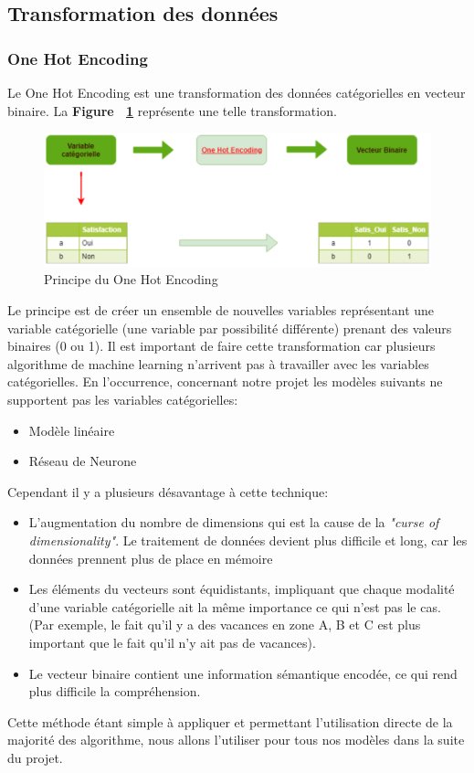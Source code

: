 \documentclass{article} %
\begin{document}
\subsection{Transformation des données}
\subsubsection{One Hot Encoding}
Le One Hot Encoding est une transformation des données catégorielles en vecteur binaire. La \textbf{Figure ~\ref{fig:OHE}} représente une telle transformation.
\begin{figure}[!h]
	\centering
	\includegraphics[keepaspectratio = true,scale=0.55]{OHE.png}
	\caption{Principe du One Hot Encoding}
	\label{fig:OHE}
\end{figure}
Le principe est de créer un ensemble de nouvelles variables représentant une variable catégorielle (une variable par possibilité différente) prenant des valeurs binaires (0 ou 1). Il est important de faire cette transformation car plusieurs algorithme de machine learning n'arrivent pas à travailler avec les variables catégorielles. En l'occurrence, concernant notre projet les modèles suivants ne supportent pas les variables catégorielles: \begin{itemize}
	\item Modèle linéaire
	\item Réseau de Neurone
\end{itemize}
Cependant il y a plusieurs désavantage à cette technique:
\begin{itemize}
	\item L'augmentation du nombre de dimensions qui est la cause de la \textit{"curse of dimensionality"}. Le traitement de données devient plus difficile et long, car les données prennent plus de place en mémoire
	\item Les éléments du vecteurs sont équidistants, impliquant que chaque modalité d'une variable catégorielle ait la même importance ce qui n'est pas le cas. (Par exemple, le fait qu'il y a des vacances en zone A, B et C est plus important que le fait qu'il n'y ait pas de vacances).
	\item Le vecteur binaire contient une information sémantique encodée, ce qui rend plus difficile la compréhension.
\end{itemize}
Cette méthode étant simple à appliquer et permettant l'utilisation directe de la majorité des algorithme, nous allons l'utiliser pour tous nos modèles dans la suite du projet.
 
\end{document}
